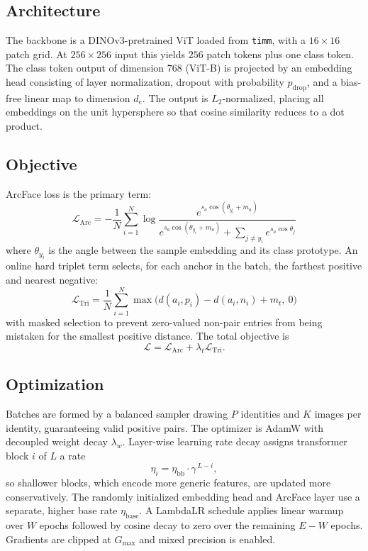 \documentclass[conference]{IEEEtran}
\begin{document}
\subsection{Architecture}

The backbone is a DINOv3-pretrained ViT loaded from \texttt{timm}, with a $16\times16$
patch grid. At $256\times256$ input this yields $256$ patch tokens plus one class
token. The class token output of dimension $768$ (ViT-B) is projected by an embedding
head consisting of layer normalization, dropout with probability $p_{\text{drop}}$, and
a bias-free linear map to dimension $d_e$. The output is $L_2$-normalized, placing all
embeddings on the unit hypersphere so that cosine similarity reduces to a dot product.

\subsection{Objective}

ArcFace loss is the primary term:
\begin{equation}
  \mathcal{L}_{\text{Arc}} = -\frac{1}{N}\sum_{i=1}^{N}
  \log \frac{e^{s_a \cos(\theta_{y_i} + m_a)}}
  {e^{s_a \cos(\theta_{y_i} + m_a)} + \sum_{j \neq y_i} e^{s_a \cos\theta_j}}
\end{equation}
where $\theta_{y_i}$ is the angle between the sample embedding and its class prototype.
An online hard triplet term selects, for each anchor in the batch, the farthest positive
and nearest negative:
\begin{equation}
  \mathcal{L}_{\text{Tri}} = \frac{1}{N}\sum_{i=1}^{N}
  \max\!\big(d(a_i, p_i) - d(a_i, n_i) + m_t,\ 0\big)
\end{equation}
with masked selection to prevent zero-valued non-pair entries from being mistaken for
the smallest positive distance. The total objective is
\begin{equation}
  \mathcal{L} = \mathcal{L}_{\text{Arc}} + \lambda_t \mathcal{L}_{\text{Tri}}.
\end{equation}

\subsection{Optimization}

Batches are formed by a balanced sampler drawing $P$ identities and $K$ images per
identity, guaranteeing valid positive pairs. The optimizer is AdamW with decoupled
weight decay $\lambda_w$. Layer-wise learning rate decay assigns transformer block $i$
of $L$ a rate
\begin{equation}
  \eta_i = \eta_{\text{bb}} \cdot \gamma^{\,L-i},
\end{equation}
so shallower blocks, which encode more generic features, are updated more conservatively.
The randomly initialized embedding head and ArcFace layer use a separate, higher base
rate $\eta_{\text{base}}$. A LambdaLR schedule applies linear warmup over $W$ epochs
followed by cosine decay to zero over the remaining $E - W$ epochs. Gradients are
clipped at $G_{\max}$ and mixed precision is enabled.
\end{document}
